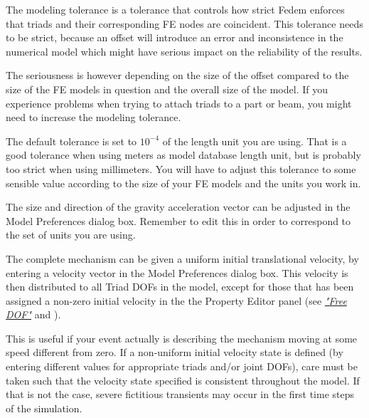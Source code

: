 
The modeling tolerance is a tolerance that controls how strict Fedem enforces
that triads and their corresponding FE nodes are coincident.
This tolerance needs to be strict, because an offset will introduce an error
and inconsistence in the numerical model which might have serious impact on the
reliability of the results.

The seriousness is however depending on the size of the offset compared to the
size of the FE models in question and the overall size of the model.
If you experience problems when trying to attach triads to a part or beam,
you might need to increase the modeling tolerance.

The default tolerance is set to $10^{-4}$ of the length unit you are using.
That is a good tolerance when using meters as model database length unit,
but is probably too strict when using millimeters.
You will have to adjust this tolerance to some sensible value according to
the size of your FE models and the units you work in.


\clearpage



The size and direction of the gravity acceleration vector can be adjusted in the
Model Preferences dialog box. Remember to edit this in order to correspond
to the set of units you are using.




The complete mechanism can be given a uniform initial translational velocity,
by entering a velocity vector in the Model Preferences dialog box.
This velocity is then distributed to all Triad DOFs in the model,
except for those that has been assigned a non-zero initial velocity in the
the Property Editor panel (see \protect\hyperlink{free-dof}{\sl"Free DOF"} and
).

This is useful if your event actually is describing the mechanism moving at some
speed different from zero. If a non-uniform initial velocity state is defined
(by entering different values for appropriate triads and/or joint DOFs),
care must be taken such that the velocity state specified is consistent
throughout the model. If that is not the case, severe fictitious transients
may occur in the first time steps of the simulation.


